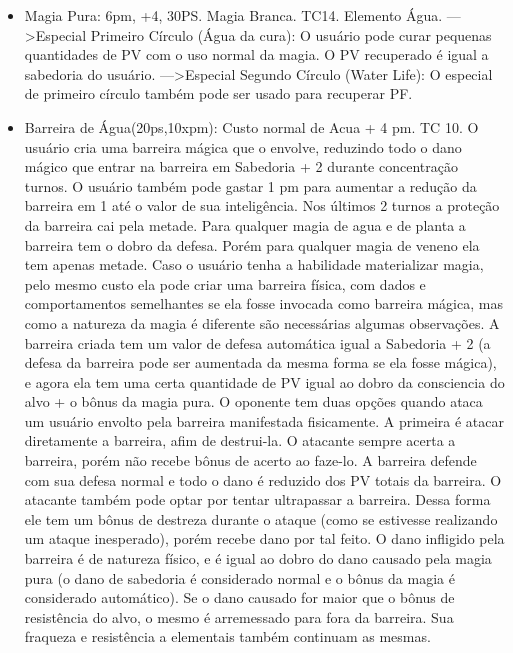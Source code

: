 \begin{itemize}
	\item Magia Pura: 6pm, +4, 30PS. Magia Branca. TC14. Elemento Água.\newline
--->Especial Primeiro Círculo (Água da cura): O usuário pode curar pequenas quantidades de PV com o uso normal da magia. O PV recuperado é igual a sabedoria do usuário.\newline
--->Especial Segundo Círculo (Water Life): O especial de primeiro círculo também pode ser usado para recuperar PF.

\item Barreira de Água(20ps,10xpm): Custo normal de Acua + 4 pm. TC 10.\newline
O usuário cria uma barreira mágica que o envolve, reduzindo todo o dano mágico que entrar na barreira em Sabedoria + 2 durante concentração turnos. O usuário também pode gastar 1 pm para aumentar a redução da barreira em 1 até o valor de sua inteligência. Nos últimos 2 turnos a proteção da barreira cai pela metade. Para qualquer magia de agua e de planta a barreira tem o dobro da defesa. Porém para qualquer magia de veneno ela tem apenas metade. Caso o usuário tenha a habilidade materializar magia, pelo mesmo custo ela pode criar uma barreira física, com dados e comportamentos semelhantes se ela fosse invocada como barreira mágica, mas como a natureza da magia é diferente são necessárias algumas observações. A barreira criada tem um valor de defesa automática igual a Sabedoria + 2 (a defesa da barreira pode ser aumentada da mesma forma se ela fosse mágica), e agora ela tem uma certa quantidade de PV igual ao dobro da consciencia do alvo + o bônus da magia pura. O oponente tem duas opções quando ataca um usuário envolto pela barreira manifestada fisicamente. A primeira é atacar diretamente a barreira, afim de destrui-la. O atacante sempre acerta a barreira, porém não recebe bônus de acerto ao faze-lo. A barreira defende com sua defesa normal e todo o dano é reduzido dos PV totais da barreira. O atacante também pode optar por tentar ultrapassar a barreira. Dessa forma ele tem um bônus de destreza durante o ataque (como se estivesse realizando um ataque inesperado), porém recebe dano por tal feito. O dano infligido pela barreira é de natureza físico, e é igual ao dobro do dano causado pela magia pura (o dano de sabedoria é considerado normal e o bônus da magia é considerado automático). Se o dano causado for maior que o bônus de resistência do alvo, o mesmo é arremessado para fora da barreira. Sua fraqueza e resistência a elementais também continuam as mesmas. 


\end{itemize}
